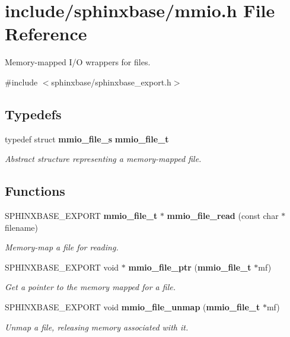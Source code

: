\section{include/sphinxbase/mmio.h \-File \-Reference}
\label{mmio_8h}


\-Memory-\/mapped \-I/\-O wrappers for files.  


{\ttfamily \#include $<$sphinxbase/sphinxbase\-\_\-export.\-h$>$}\*
\subsection*{\-Typedefs}
\begin{DoxyCompactItemize}
\item 
typedef struct {\bf mmio\-\_\-file\-\_\-s} {\bf mmio\-\_\-file\-\_\-t}\label{mmio_8h_ae27ed04d8142d77aae885c8cb8c9fa3b}

\begin{DoxyCompactList}\small\item\em \-Abstract structure representing a memory-\/mapped file. \end{DoxyCompactList}\end{DoxyCompactItemize}
\subsection*{\-Functions}
\begin{DoxyCompactItemize}
\item 
\-S\-P\-H\-I\-N\-X\-B\-A\-S\-E\-\_\-\-E\-X\-P\-O\-R\-T {\bf mmio\-\_\-file\-\_\-t} $\ast$ {\bf mmio\-\_\-file\-\_\-read} (const char $\ast$filename)
\begin{DoxyCompactList}\small\item\em \-Memory-\/map a file for reading. \end{DoxyCompactList}\item 
\-S\-P\-H\-I\-N\-X\-B\-A\-S\-E\-\_\-\-E\-X\-P\-O\-R\-T void $\ast$ {\bf mmio\-\_\-file\-\_\-ptr} ({\bf mmio\-\_\-file\-\_\-t} $\ast$mf)\label{mmio_8h_a5e6d8bf5cd7785563abc18c70a31ce0d}

\begin{DoxyCompactList}\small\item\em \-Get a pointer to the memory mapped for a file. \end{DoxyCompactList}\item 
\-S\-P\-H\-I\-N\-X\-B\-A\-S\-E\-\_\-\-E\-X\-P\-O\-R\-T void {\bf mmio\-\_\-file\-\_\-unmap} ({\bf mmio\-\_\-file\-\_\-t} $\ast$mf)\label{mmio_8h_a341a9c1cc8a3c4bddfd2d29a1b0993f6}

\begin{DoxyCompactList}\small\item\em \-Unmap a file, releasing memory associated with it. \end{DoxyCompactList}\end{DoxyCompactItemize}


